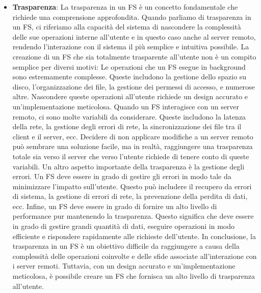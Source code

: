 \begin{itemize}
    \item \textbf{Trasparenza}: La trasparenza in un FS è un concetto fondamentale che richiede una comprensione approfondita. Quando parliamo di trasparenza in un FS, ci riferiamo alla capacità del sistema di nascondere la complessità delle sue operazioni interne all’utente e in questo caso anche al server remoto, rendendo l’interazione con il sistema il più semplice e intuitiva possibile. La creazione di un FS che sia totalmente trasparente all’utente non è un compito semplice per diversi motivi: Le operazioni che un FS esegue in background sono estremamente complesse. Queste includono la gestione dello spazio su disco, l’organizzazione dei file, la gestione dei permessi di accesso, e numerose altre. Nascondere queste operazioni all’utente richiede un design accurato e un’implementazione meticolosa. Quando un FS interagisce con un server remoto, ci sono molte variabili da considerare. Queste includono la latenza della rete, la gestione degli errori di rete, la sincronizzazione dei file tra il client e il server, ecc. Decidere di non applicare modifiche a un server remoto può sembrare una soluzione facile, ma in realtà, raggiungere una trasparenza totale sia verso il server che verso l’utente richiede di tenere conto di queste variabili. Un altro aspetto importante della trasparenza è la gestione degli errori. Un FS deve essere in grado di gestire gli errori in modo tale da minimizzare l’impatto sull’utente. Questo può includere il recupero da errori di sistema, la gestione di errori di rete, la prevenzione della perdita di dati, ecc. Infine, un FS deve essere in grado di fornire un alto livello di performance pur mantenendo la trasparenza. Questo significa che deve essere in grado di gestire grandi quantità di dati, eseguire operazioni in modo efficiente e rispondere rapidamente alle richieste dell’utente. In conclusione, la trasparenza in un FS è un obiettivo difficile da raggiungere a causa della complessità delle operazioni coinvolte e delle sfide associate all’interazione con i server remoti. Tuttavia, con un design accurato e un’implementazione meticolosa, è possibile creare un FS che fornisca un alto livello di trasparenza all’utente.

\end{itemize}
